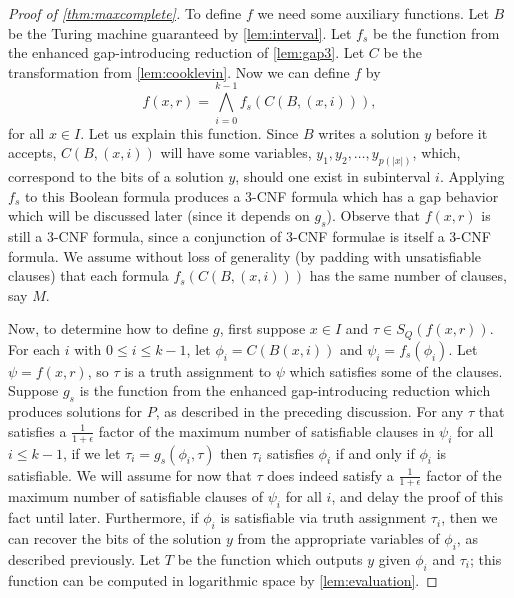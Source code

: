 \documentclass[]{article}
\begin{document}
\begin{proof}[Proof of \autoref{thm:maxcomplete}]
  To define $f$ we need some auxiliary functions.
  Let $B$ be the Turing machine guaranteed by \autoref{lem:interval}.
  Let $f_s$ be the function from the enhanced gap-introducing reduction of \autoref{lem:gap3}.
  Let $C$ be the transformation from \autoref{lem:cooklevin}.
  Now we can define $f$ by
  \begin{displaymath}
    f(x, r) = \bigwedge_{i = 0}^{k - 1}{f_s(C(B, (x, i)))},
  \end{displaymath}
  for all $x \in I$.
  Let us explain this function.
  Since $B$ writes a solution $y$ before it accepts, $C(B, (x, i))$ will have some variables, $y_1, y_2, \dotsc, y_{p(|x|)}$, which, correspond to the bits of a solution $y$, should one exist in subinterval $i$.
  Applying $f_s$ to this Boolean formula produces a 3-CNF formula which has a gap behavior which will be discussed later (since it depends on $g_s$).
  Observe that $f(x, r)$ is still a 3-CNF formula, since a conjunction of 3-CNF formulae is itself a 3-CNF formula.
  We assume without loss of generality (by padding with unsatisfiable clauses) that each formula $f_s(C(B, (x, i)))$ has the same number of clauses, say $M$.

  Now, to determine how to define $g$, first suppose $x \in I$ and $\tau \in S_Q(f(x, r))$.
  For each $i$ with $0 \leq i \leq k - 1$, let $\phi_i = C(B(x, i))$ and $\psi_i = f_s(\phi_i)$.
  Let $\psi = f(x, r)$, so $\tau$ is a truth assignment to $\psi$ which satisfies some of the clauses.
  Suppose $g_s$ is the function from the enhanced gap-introducing reduction which produces solutions for $P$, as described in the preceding discussion.
  For any $\tau$ that satisfies a $\frac{1}{1 + \epsilon}$ factor of the maximum number of satisfiable clauses in $\psi_i$ for all $i \leq k - 1$, if we let $\tau_i = g_s(\phi_i, \tau)$ then $\tau_i$ satisfies $\phi_i$ if and only if $\phi_i$ is satisfiable.
  We will assume for now that $\tau$ does indeed satisfy a $\frac{1}{1 + \epsilon}$ factor of the maximum number of satisfiable clauses of $\psi_i$ for all $i$, and delay the proof of this fact until later.
  Furthermore, if $\phi_i$ is satisfiable via truth assignment $\tau_i$, then we can recover the bits of the solution $y$ from the appropriate variables of $\phi_i$, as described previously.
  Let $T$ be the function which outputs $y$ given $\phi_i$ and $\tau_i$; this function can be computed in logarithmic space by \autoref{lem:evaluation}.


\end{proof}
\end{document}
